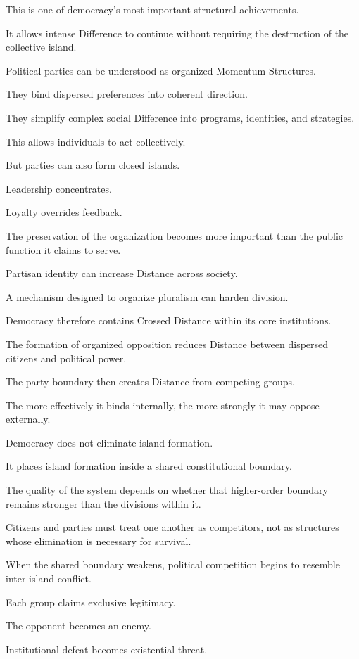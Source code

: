 This is one of democracy’s most important structural achievements.

It allows intense Difference to continue without requiring the destruction of the collective island.

Political parties can be understood as organized Momentum Structures.

They bind dispersed preferences into coherent direction.

They simplify complex social Difference into programs, identities, and strategies.

This allows individuals to act collectively.

But parties can also form closed islands.

Leadership concentrates.

Loyalty overrides feedback.

The preservation of the organization becomes more important than the public function it claims to serve.

Partisan identity can increase Distance across society.

A mechanism designed to organize pluralism can harden division.

Democracy therefore contains Crossed Distance within its core institutions.

The formation of organized opposition reduces Distance between dispersed citizens and political power.

The party boundary then creates Distance from competing groups.

The more effectively it binds internally, the more strongly it may oppose externally.

Democracy does not eliminate island formation.

It places island formation inside a shared constitutional boundary.

The quality of the system depends on whether that higher-order boundary remains stronger than the divisions within it.

Citizens and parties must treat one another as competitors, not as structures whose elimination is necessary for survival.

When the shared boundary weakens, political competition begins to resemble inter-island conflict.

Each group claims exclusive legitimacy.

The opponent becomes an enemy.

Institutional defeat becomes existential threat.

